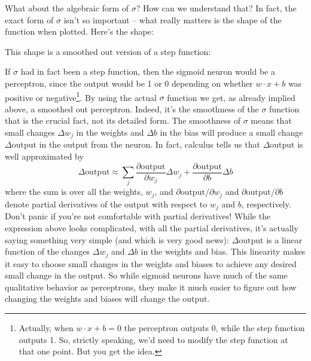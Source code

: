 \documentclass[a4paper,twoside,10pt]{book}
\begin{document}
What about the algebraic form of $\sigma$? How can we understand that? In fact, the exact form of $\sigma$ isn't so important -- what really matters is the shape of the function when plotted. Here's the shape:


This shape is a smoothed out version of a step function:


If $\sigma$ had in fact been a step function, then the sigmoid neuron would be a perceptron, since the output would be 1 or 0 depending on whether $w\cdot x + b$ was positive or negative\footnote{Actually, when $w\cdot x+b = 0$ the perceptron outputs 0, while the step function outputs 1. So, strictly speaking, we'd need to modify the step function at that one point. But you get the idea.}. By using the actual $\sigma$ function we get, as already implied above, a smoothed out perceptron. Indeed, it's the smoothness of the $\sigma$ function that is the crucial fact, not its detailed form. The smoothness of $\sigma$ means that small changes $\Delta{}w_j$ in the weights and $\Delta{}b$ in the bias will produce a small change $\Delta\textrm{output}$ in the output from the neuron. In fact, calculus tells us that $\Delta\textrm{output}$ is well approximated by
\begin{equation}
\Delta\textrm{output}\approx \sum_j\frac{\partial\textrm{output}}{\partial w_j}\Delta w_j + \frac{\partial\textrm{output}}{\partial b}\Delta b
\label{eq:doutput}
\end{equation}		
where the sum is over all the weights, $w_j$, and $\partial\textrm{output}/\partial w_j$ and $\partial\textrm{output}/\partial b$ denote partial derivatives of the output with respect to $w_j$ and $b$, respectively. Don't panic if you're not comfortable with partial derivatives! While the expression above looks complicated, with all the partial derivatives, it's actually saying something very simple (and which is very good news): $\Delta\textrm{output}$ is a linear function of the changes $\Delta w_j$ and $\Delta b$ in the weights and bias. This linearity makes it easy to choose small changes in the weights and biases to achieve any desired small change in the output. So while sigmoid neurons have much of the same qualitative behavior as perceptrons, they make it much easier to figure out how changing the weights and biases will change the output.
\end{document}
